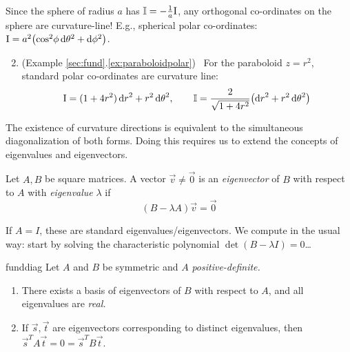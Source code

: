 \begin{examples}{}{}
\exstart Since the sphere of radius $a$ has $\mathbb{I}=-\frac 1a\mathrm{I}$, any orthogonal co-ordinates on the sphere are curvature-line! E.g., spherical polar co-ordinates: $\mathrm{I}=a^2\bigl(\cos^2\!\phi\,\mathrm{d}\theta^2+\mathrm{d}\phi^2\bigr)$.
\begin{enumerate}\setcounter{enumi}{1}
  \item (Example \ref*{sec:fund}.\ref{ex:paraboloidpolar}) \ For the paraboloid $z=r^2$, standard polar co-ordinates are curvature line:
  \[\mathrm{I}=(1+4r^2)\,{\mathrm{d} r}^2+r^2\,{\mathrm{d}\theta}^2,\qquad\mathbb{I}=\frac{2}{\sqrt{1+4r^2}}\big({\mathrm{d} r}^2+r^2\,{\mathrm{d}\theta}^2\bigr)\]
\end{enumerate}
\end{examples}




The existence of curvature directions is equivalent to the simultaneous diagonalization of both forms. Doing this requires us to extend the concepts of eigenvalues and eigenvectors.


\begin{defn}{}{}
Let $A,B$ be square matrices. A vector $\vec v\neq \vec 0$ is an \emph{eigenvector} of $B$ with respect to $A$ with \emph{eigenvalue} $\lambda$ if
\[(B-\lambda A)\vec v=\vec 0\]
\end{defn}

If $A=I$, these are standard eigenvalues/eigenvectors. We compute in the usual way: start by solving the characteristic polynomial $\det(B-\lambda I)=0$\ldots

\goodbreak



\begin{thm}{}{funddiag}
Let $A$ and $B$ be symmetric and $A$ \emph{positive-definite.\footnotemark}
\begin{enumerate}
  \item There exists a basis of eigenvectors of $B$ with respect to $A$, and all eigenvalues are \emph{real.}
  \item If $\vec s,\vec t$ are eigenvectors corresponding to distinct eigenvalues, then $\vec s^TA\vec t=0=\vec s^TB\vec t$.
\end{enumerate}
\end{thm}

